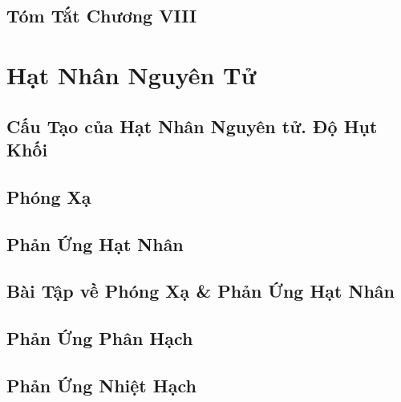\documentclass{article}
\numberwithin{equation}{section}
\begin{document}

\subsection{Tóm Tắt Chương VIII}


\section{Hạt Nhân Nguyên Tử}

\subsection{Cấu Tạo của Hạt Nhân Nguyên tử. Độ Hụt Khối}


\subsection{Phóng Xạ}


\subsection{Phản Ứng Hạt Nhân}


\subsection{Bài Tập về Phóng Xạ \& Phản Ứng Hạt Nhân}


\subsection{Phản Ứng Phân Hạch}


\subsection{Phản Ứng Nhiệt Hạch}
\end{document}
